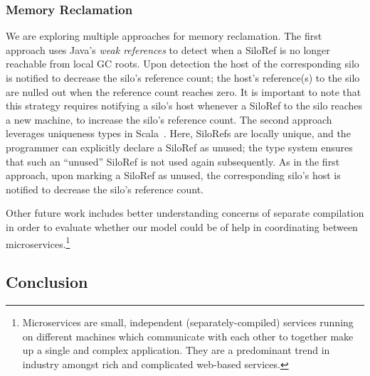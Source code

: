 \documentclass{jfp1}
\begin{document}
\subsubsection{Memory Reclamation}

We are exploring multiple approaches for memory reclamation.
The first
approach uses Java's {\em weak references} to detect when a SiloRef is no longer
reachable from local GC roots. Upon detection the host of the corresponding silo
is notified to decrease the silo's reference count; the host's reference(s) to
the silo are nulled out when the reference count reaches zero. It is important
to note that this strategy requires notifying a silo's host whenever a SiloRef
to the silo reaches a new machine, to increase the silo's reference count. The
second approach leverages uniqueness types in Scala~\cite{Uniqueness,HallerL16}. Here,
SiloRefs are locally unique, and the programmer can explicitly declare a SiloRef
as unused; the type system ensures that such an ``unused'' SiloRef is not used
again subsequently. As in the first approach, upon marking a SiloRef as unused,
the corresponding silo's host is notified to decrease the silo's reference
count.

Other future work includes better understanding concerns of separate compilation
in order to evaluate whether our model could be of help in coordinating between
microservices.\footnote{Microservices are small, independent
(separately-compiled) services running on different machines which communicate
with each other to together make up a single and complex application. They are a
predominant trend in industry amongst rich and complicated web-based services.}

\subsection{Conclusion}
\end{document}
